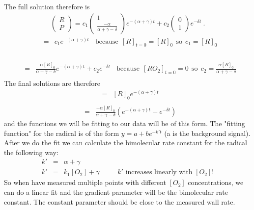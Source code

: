 \documentclass[10pt, a4paper]{article}
\begin{document}
The full solution therefore is 
\begin{eqnarray*}
\begin{pmatrix}
R \\
P 
\end{pmatrix}
= c_1 \begin{pmatrix}1 \\ \frac{-\alpha}{\alpha + \gamma - \delta} \end{pmatrix} e^{-(\alpha + \gamma)t} + c_2 \begin{pmatrix}0 \\ 1 \end{pmatrix} e^{-\delta t}  \: . 
\end{eqnarray*}
\begin{eqnarray*}
[R] &=& c_1e^{-(\alpha + \gamma)t} \:\:\:\: \text{because} \:\ [R]_{t = 0} = [R]_0  \:\: \text{so}  \:\: c_1 = [R]_0 \\
\end{eqnarray*}
\\
\begin{eqnarray*}
[RO_2] &=& \frac{-\alpha[R]_0}{\alpha + \gamma - \delta}e^{-(\alpha + \gamma)t} + c_2e^{-\delta t} \:\:\:\: \text{because} \:\ [RO_2]_{t = 0} = 0 
\:\: \text{so}  \:\: c_2 = \frac{\alpha[R]_0}{\alpha + \gamma - \delta} \\
\end{eqnarray*}
The final solutions are therefore 
\begin{eqnarray*}
[R] &=& [R]_0e^{-(\alpha + \gamma)t} \\
\end{eqnarray*}
\begin{eqnarray*}
[RO_2] &=& \frac{-\alpha[R]_0}{\alpha + \gamma - \delta} \left(e^{-(\alpha + \gamma)t} - e^{-\delta t} \right)
\end{eqnarray*}
and the functions we will be fitting to our data will be of this form. The "fitting function" for the radical is of the form $y = a + be^{-k't}$ (a is the background signal). After we do the fit we can calculate the bimolecular rate constant for the radical the following way: 
\begin{eqnarray*}
k' &=& \alpha + \gamma \\
k' &=& k_1[O_2] + \gamma       \:\:\:\: \:\:\:\: \:\:\:\:\text{$k'$ increases linearly with $[O_2]$!} 
\end{eqnarray*}
So when have measured multiple points with different $[O_2]$ concentrations, we can do a linear fit and the gradient parameter will be the bimolecular rate constant. The constant parameter should be close to the measured wall rate.  
\end{document}
